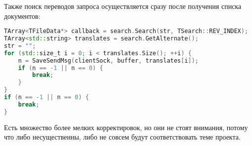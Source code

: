 Также поиск переводов запроса осуществляется сразу после получения списка документов:
\begin{lstlisting}[language=C++]
TArray<TFileData*> callback = search.Search(str, TSearch::REV_INDEX);
TArray<std::string> translates = search.GetAlternate();
str = "";
for (std::size_t i = 0; i < translates.Size(); ++i) {
    n = SaveSendMsg(clientSock, buffer, translates[i]);
    if (n == -1 || n == 0) {
        break;
    }
}
if (n == -1 || n == 0) {
    break;
}
\end{lstlisting}

Есть множество более мелких корректировок, но они не стоят внимания, потому что либо несущественны, либо не совсем будут соответствовать теме проекта.